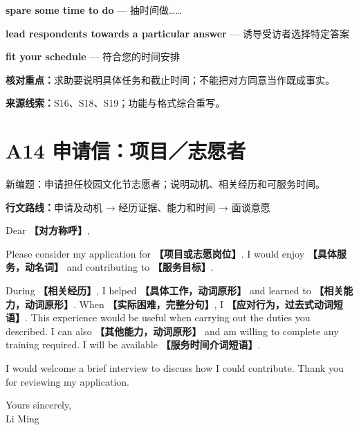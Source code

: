 \documentclass[11pt,a4paper,fontset=macnew]{ctexart}
\newenvironment{writing}{\begingroup\fontsize{10.5}{13.5}\selectfont\setlength{\parskip}{3pt}}{\par\endgroup}
\begin{document}
{\small\textbf{spare some time to do} — 抽时间做……}\par
{\small\textbf{lead respondents towards a particular answer} — 诱导受访者选择特定答案}\par
{\small\textbf{fit your schedule} — 符合您的时间安排}\par
{\small\textbf{核对重点：}求助要说明具体任务和截止时间；不能把对方同意当作既成事实。}\par
{\fontsize{8}{10}\selectfont\textbf{来源线索：}S16、S18、S19；功能与格式综合重写。}\par
\clearpage\section*{A14  申请信：项目／志愿者}
{\small 新编题：申请担任校园文化节志愿者；说明动机、相关经历和可服务时间。}\par
{\small\textbf{行文路线：}申请及动机 → 经历证据、能力和时间 → 面谈意愿}\par
\par\vspace{4pt}{\bfseries 可替换模板}\par\nopagebreak
\begin{writing}
\noindent Dear {\bfseries 【对方称呼】},\par
Please consider my application for {\bfseries 【项目或志愿岗位】}. I would enjoy {\bfseries 【具体服务，动名词】} and contributing to {\bfseries 【服务目标】}.

During {\bfseries 【相关经历】}, I helped {\bfseries 【具体工作，动词原形】} and learned to {\bfseries 【相关能力，动词原形】}. When {\bfseries 【实际困难，完整分句】}, I {\bfseries 【应对行为，过去式动词短语】}. This experience would be useful when carrying out the duties you described. I can also {\bfseries 【其他能力，动词原形】} and am willing to complete any training required. I will be available {\bfseries 【服务时间介词短语】}.

I would welcome a brief interview to discuss how I could contribute. Thank you for reviewing my application.

\noindent Yours sincerely,\\Li Ming\par
\end{writing}
\par\vspace{4pt}{\bfseries 完整套用示例}\par\nopagebreak
\end{document}
